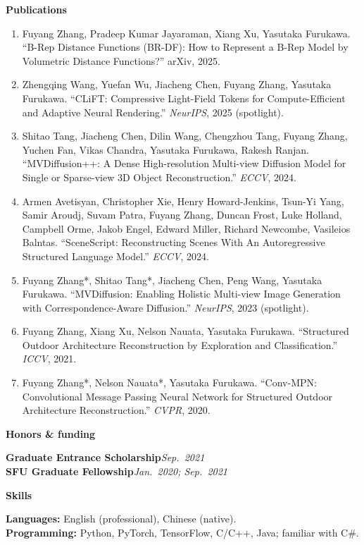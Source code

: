 \documentclass[10pt]{article}
\newcommand{\cvsec}[1]{%
  \vspace{1.05em}%
  {\large\bfseries #1\par}%
  \vspace{1pt}{\color{black!40}\rule{\textwidth}{0.45pt}}%
  \vspace{0.12em}%
}
\newcommand{\cvline}[2]{\textbf{#1}\hfill\textit{#2}\\}
\begin{document}
\cvsec{Publications}
{\small
\begin{enumerate}[leftmargin=1.35em,itemsep=0.35em]
  \item Fuyang Zhang, Pradeep Kumar Jayaraman, Xiang Xu, Yasutaka Furukawa.
    ``B-Rep Distance Functions (BR-DF): How to Represent a B-Rep Model by Volumetric Distance Functions?''
    arXiv, 2025.

  \item Zhengqing Wang, Yuefan Wu, Jiacheng Chen, Fuyang Zhang, Yasutaka Furukawa.
    ``CLiFT: Compressive Light-Field Tokens for Compute-Efficient and Adaptive Neural Rendering.''
    \textit{NeurIPS}, 2025 (spotlight).

  \item Shitao Tang, Jiacheng Chen, Dilin Wang, Chengzhou Tang, Fuyang Zhang, Yuchen Fan, Vikas Chandra, Yasutaka Furukawa, Rakesh Ranjan.
    ``MVDiffusion++: A Dense High-resolution Multi-view Diffusion Model for Single or Sparse-view 3D Object Reconstruction.''
    \textit{ECCV}, 2024.

  \item Armen Avetisyan, Christopher Xie, Henry Howard-Jenkins, Tsun-Yi Yang, Samir Aroudj, Suvam Patra, Fuyang Zhang, Duncan Frost, Luke Holland, Campbell Orme, Jakob Engel, Edward Miller, Richard Newcombe, Vasileios Balntas.
    ``SceneScript: Reconstructing Scenes With An Autoregressive Structured Language Model.''
    \textit{ECCV}, 2024.

  \item Fuyang Zhang*, Shitao Tang*, Jiacheng Chen, Peng Wang, Yasutaka Furukawa.
    ``MVDiffusion: Enabling Holistic Multi-view Image Generation with Correspondence-Aware Diffusion.''
    \textit{NeurIPS}, 2023 (spotlight).

  \item Fuyang Zhang, Xiang Xu, Nelson Nauata, Yasutaka Furukawa.
    ``Structured Outdoor Architecture Reconstruction by Exploration and Classification.''
    \textit{ICCV}, 2021.

  \item Fuyang Zhang*, Nelson Nauata*, Yasutaka Furukawa.
    ``Conv-MPN: Convolutional Message Passing Neural Network for Structured Outdoor Architecture Reconstruction.''
    \textit{CVPR}, 2020.
\end{enumerate}
}

\cvsec{Honors \& funding}
\cvline{Graduate Entrance Scholarship}{Sep.\ 2021}
\cvline{SFU Graduate Fellowship}{Jan.\ 2020; Sep.\ 2021}

\cvsec{Skills}
\textbf{Languages:} English (professional), Chinese (native).\\
\textbf{Programming:} Python, PyTorch, TensorFlow, C/C++, Java; familiar with C\#.
\end{document}
